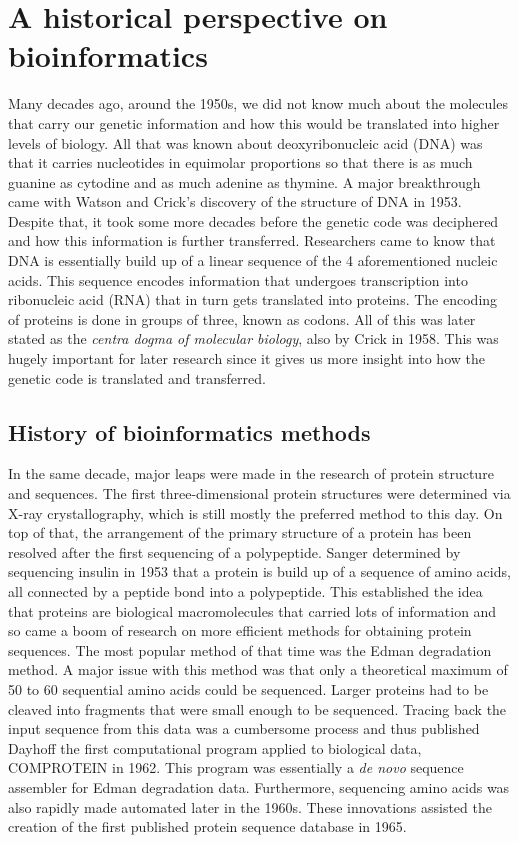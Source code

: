 \section{A historical perspective on bioinformatics}
Many decades ago, around the 1950s, we did not know much about the molecules that carry our genetic information and how this would be translated into higher levels of biology. All that was known about deoxyribonucleic acid (DNA) was that it carries nucleotides in equimolar proportions so that there is as much guanine as cytodine and as much adenine as thymine. A major breakthrough came with Watson and Crick's discovery of the structure of DNA in 1953\cite{dnastruct}. Despite that, it took some more decades before the genetic code was deciphered and how this information is further transferred. Researchers came to know that DNA is essentially build up of a linear sequence of the 4 aforementioned nucleic acids. This sequence encodes information that undergoes transcription into ribonucleic acid (RNA) that in turn gets translated into proteins. The encoding of proteins is done in groups of three, known as codons. All of this was later stated as the \textit{centra dogma of molecular biology}, also by Crick in 1958\cite{dogma}. This was hugely important for later research since it gives us more insight into how the genetic code is translated and transferred.

\subsection{History of bioinformatics methods}
In the same decade, major leaps were made in the research of protein structure and sequences. The first three-dimensional protein structures were determined via X-ray crystallography\cite{xray}, which is still mostly the preferred method to this day. On top of that, the arrangement of the primary structure of a protein has been resolved after the first sequencing of a polypeptide. Sanger determined by sequencing insulin in 1953\cite{insulin} that a protein is build up of a sequence of amino acids, all connected by a peptide bond into a polypeptide. This established the idea that proteins are biological macromolecules that carried lots of information\cite{primstruct} and so came a boom of research on more efficient methods for obtaining protein sequences. The most popular method of that time was the Edman degradation method. A major issue with this method was that only a theoretical maximum of 50 to 60 sequential amino acids could be sequenced. Larger proteins had to be cleaved into fragments that were small enough to be sequenced. Tracing back the input sequence from this data was a cumbersome process and thus published Dayhoff the first computational program applied to biological data, COMPROTEIN\cite{comprotein} in 1962. This program was essentially a \textit{de novo} sequence assembler for Edman degradation data. Furthermore, sequencing amino acids was also rapidly made automated later in the 1960s. These innovations assisted the creation of the first published protein sequence database\cite{atlas} in 1965.


